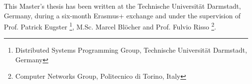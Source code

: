 This Master's thesis has been written at the Technische Universit{\"a}t Darmstadt, Germany, during a six-month Erasmus+ exchange and under the supervision of Prof. Patrick Eugster \footnote[2]{\label{tuda} Distributed Systems Programming Group, Technische Universit{\"a}t Darmstadt, Germany}, M.Sc. Marcel Bl{\"o}cher  and Prof. Fulvio Risso \footnote[3]{\label{polito} Computer Networks Group, Politecnico di Torino, Italy}.